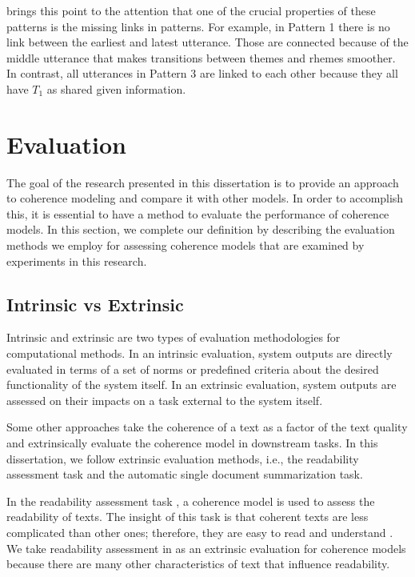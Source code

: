  brings this point to the attention that one of the crucial properties of these patterns is the missing links in patterns.  
For example, in Pattern 1 there is no link between the earliest and latest utterance. 
Those are connected because of the middle utterance that makes transitions between themes and rhemes smoother. 
In contrast, all utterances in Pattern 3  are linked to each other because they all have $T_1$ as shared given information. 

\section{Evaluation}
\label{sec:coh-eval}

The goal of the research presented in this dissertation is to provide an approach to coherence modeling and compare it with other models. 
In order to accomplish this, it is essential to have a method to evaluate the performance of coherence models. 
In this section, we complete our definition by describing the evaluation methods we employ for assessing coherence models that are examined by experiments in this research.   

\subsection{Intrinsic vs Extrinsic}

Intrinsic and extrinsic are two types of evaluation methodologies for computational methods.  
In an intrinsic evaluation, system outputs are directly evaluated in terms of a set of norms or predefined criteria about the desired functionality of the system itself. 
In an extrinsic evaluation, system outputs are assessed on their impacts on a task external to the system itself. 

Some other approaches take the coherence of a text as a factor of the text quality and extrinsically evaluate the coherence model in downstream tasks. 
In this dissertation, we follow extrinsic evaluation methods, i.e., the readability assessment task and the automatic single document summarization task.  

In the readability assessment task  \cite{pitler08}, a coherence model is used to assess the readability of texts. 
The insight of this task is that coherent texts are less complicated than other ones; therefore, they are easy to read and understand \cite{pitler08}. 
We take readability assessment in as an extrinsic evaluation for coherence models because there are many other characteristics of text that influence readability.  


